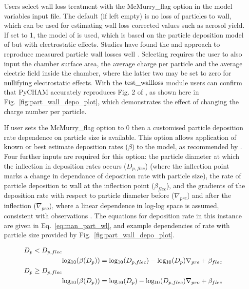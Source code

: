 \documentclass[gmd, manuscript]{copernicus}
\begin{document}
Users select wall loss treatment with the McMurry\_flag option in the model variables input file.  The default (if left empty) is no loss of particles to wall, which can be used for estimating wall loss corrected values such as aerosol yield.  If set to 1, the model of \citet{McMurry1985} is used, which is based on the particle deposition model of \citet{Crump1981} but with electrostatic effects.  Studies have found the \citet{Crump1981} and \citet{McMurry1985} approach to reproduce measured particle wall losses well \citep{Chen1992, Kim2001}.  Selecting \citet{McMurry1985} requires the user to also input the chamber surface area, the average charge per particle and the average electric field inside the chamber, where the latter two may be set to zero for nullifying electrostatic effects.  With the $\rm{test\_wallloss}$ module users can confirm that PyCHAM accurately reproduces Fig. 2 of \citet{McMurry1985}, as shown here in Fig.~\ref{fig:part_wall_depo_plot}, which demonstrates the effect of changing the charge number per particle.

If user sets the McMurry\_flag option to 0 then a customised particle deposition rate dependence on particle size is available.  This option allows application of known or best estimate deposition rates ($\beta$) to the model, as recommended by \citet{Wang2018}.  Four further inputs are required for this option: the particle diameter at which the inflection in deposition rates occurs ($D_{p,flec}$) (where the inflection point marks a change in dependance of deposition rate with particle size), the rate of particle deposition to wall at the inflection point ($\beta_{flec}$), and the gradients of the deposition rate with respect to particle diameter before ($\nabla_{pre}$) and after the inflection ($\nabla_{pro}$), where a linear dependence in log-log space is assumed, consistent with observations \citep{Charan2019}.  The equations for deposition rate in this instance are given in Eq.~\ref{eq:man_part_wl}, and example dependencies of rate with particle size provided by Fig.~\ref{fig:part_wall_depo_plot}.

\begin{align} \label{eq:man_part_wl}
D_{p}<D_{p,flec} \nonumber \\
&\rm{log_{10}}(\mit{\beta(D_{p}})) = \rm{log_{10}}(\mit{D_{p,flec}})-\rm{log_{10}}\mit{(D_{p})}\nabla_{pre}+\beta_{flec} \nonumber \\
D_{p}\geq D_{p,flec} \nonumber \\
&\rm{log_{10}}(\mit{\beta(D_{p}})) = \rm{log_{10}}(\mit{D_{p}})-\rm{log_{10}}\mit{(D_{p,flec})}\nabla_{pro}+\beta_{flec}
\end{align}
\end{document}
